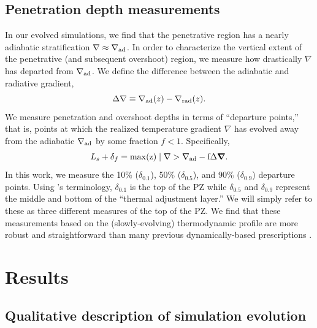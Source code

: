 \documentclass{aastex631}
\newcommand{\gradrad}{\ensuremath{\nabla_{\rm{rad}}}}
\newcommand{\gradad}{\ensuremath{\nabla_{\rm{ad}}}}
\newcommand{\justgrad}{\ensuremath{\nabla}}
\renewcommand{\vec}[1]{\boldsymbol{#1}}
\newcommand{\grad}{\vec{\nabla}}
\begin{document}
\subsection{Penetration depth measurements}
In our evolved simulations, we find that the penetrative region has a nearly adiabatic stratification $\justgrad \approx \gradad$.
In order to characterize the vertical extent of the penetrative (and subsequent overshoot) region, we measure how drastically $\justgrad$ has departed from $\gradad$.
We define the difference between the adiabatic and radiative gradient,
\begin{equation}
\Delta\justgrad \equiv \gradad(z) - \gradrad(z).
\end{equation}
We measure penetration and overshoot depths in terms of ``departure points,'' that is, points at which the realized temperature gradient $\justgrad$ has evolved away from the adiabatic $\gradad$ by some fraction $f < 1$.
Specifically,
\begin{equation}
L_s + \delta_{f} = \rm{max}(z) \mid \justgrad > \gradad - f\Delta\grad.
\end{equation}
In this work, we measure the 10\% ($\delta_{0.1}$), 50\% ($\delta_{0.5}$), and 90\% ($\delta_{0.9}$) departure points.
Using \citet{zahn1991}'s terminology, $\delta_{0.1}$ is the top of the PZ while $\delta_{0.5}$ and $\delta_{0.9}$ represent the middle and bottom of the ``thermal adjustment layer.''
We will simply refer to these as three different measures of the top of the PZ.
We find that these measurements based on the (slowly-evolving) thermodynamic profile are more robust and straightforward than many previous dynamically-based prescriptions \citep[see e.g.,][for a nice discussion]{pratt_etal_2017}.

\section{Results}
\label{sec:results}

\subsection{Qualitative description of simulation evolution}
\end{document}
